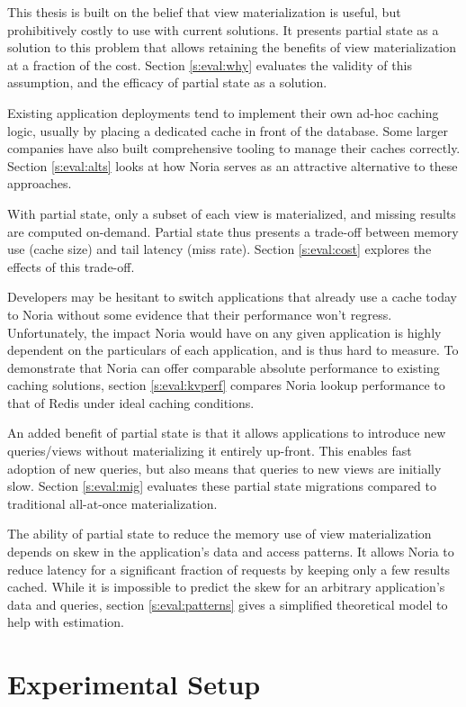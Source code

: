 This thesis is built on the belief that view materialization is useful, but
prohibitively costly to use with current solutions. It presents partial state as
a solution to this problem that allows retaining the benefits of view
materialization at a fraction of the cost. Section \ref{s:eval:why} evaluates
the validity of this assumption, and the efficacy of partial state as a
solution.

Existing application deployments tend to implement their own ad-hoc caching
logic, usually by placing a dedicated cache in front of the database. Some
larger companies have also built comprehensive tooling to manage their caches
correctly. Section \ref{s:eval:alts} looks at how Noria serves as an attractive
alternative to these approaches.

With partial state, only a subset of each view is materialized, and missing
results are computed on-demand. Partial state thus presents a trade-off between
memory use (cache size) and tail latency (miss rate). Section \ref{s:eval:cost}
explores the effects of this trade-off.

Developers may be hesitant to switch applications that already use a cache today
to Noria without some evidence that their performance won't regress.
Unfortunately, the impact Noria would have on any given application is highly
dependent on the particulars of each application, and is thus hard to measure.
To demonstrate that Noria can offer comparable absolute performance to existing
caching solutions, section \ref{s:eval:kvperf} compares Noria lookup performance
to that of Redis under ideal caching conditions.

An added benefit of partial state is that it allows applications to introduce
new queries/views without materializing it entirely up-front. This enables fast
adoption of new queries, but also means that queries to new views are initially
slow. Section \ref{s:eval:mig} evaluates these partial state migrations compared
to traditional all-at-once materialization.

The ability of partial state to reduce the memory use of view materialization
depends on skew in the application's data and access patterns. It allows Noria
to reduce latency for a significant fraction of requests by keeping only a few
results cached. While it is impossible to predict the skew for an arbitrary
application's data and queries, section \ref{s:eval:patterns} gives a simplified
theoretical model to help with estimation.

\section{Experimental Setup}
\label{s:eval:setup}

